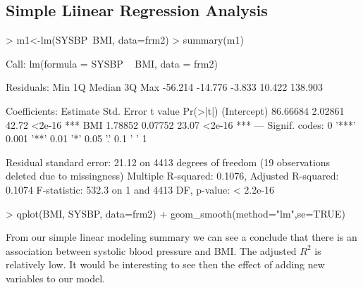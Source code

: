 \documentclass{article}
\begin{document}
\subsection{Simple Liinear Regression Analysis}
\begin{Schunk}
\begin{Sinput}
> m1<-lm(SYSBP~BMI, data=frm2)
> summary(m1)
\end{Sinput}
\begin{Soutput}
Call:
lm(formula = SYSBP ~ BMI, data = frm2)

Residuals:
    Min      1Q  Median      3Q     Max 
-56.214 -14.776  -3.833  10.422 138.903 

Coefficients:
            Estimate Std. Error t value Pr(>|t|)    
(Intercept) 86.66684    2.02861   42.72   <2e-16 ***
BMI          1.78852    0.07752   23.07   <2e-16 ***
---
Signif. codes:  0 '***' 0.001 '**' 0.01 '*' 0.05 '.' 0.1 ' ' 1

Residual standard error: 21.12 on 4413 degrees of freedom
  (19 observations deleted due to missingness)
Multiple R-squared:  0.1076,	Adjusted R-squared:  0.1074 
F-statistic: 532.3 on 1 and 4413 DF,  p-value: < 2.2e-16
\end{Soutput}
\begin{Sinput}
> qplot(BMI, SYSBP, data=frm2) + geom_smooth(method="lm",se=TRUE)
\end{Sinput}
\end{Schunk}
From our simple linear modeling summary we can see a conclude that there is an association between systolic blood pressure and BMI.  The adjusted $R^2$ is relatively low.  It would be interesting to see then the effect of adding new variables to our model.
\end{document}
